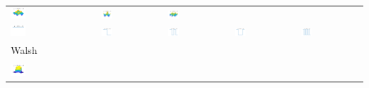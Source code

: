 \documentclass[11pt,compress,xcolor={usenames,dvipsnames},aspectratio=169]{beamer}
\begin{document}
\begin{frame}
\begin{tabular}{>{\centering}m{}>{\centering}m{}>{\centering}m{}>{\centering}m{}>{\centering}m{}}
\includegraphics[width =0.18\textwidth]{ProgramsImages/CosineSine_Degree_1_3.png}  &
\includegraphics[width =0.18\textwidth]{ProgramsImages/CosineSine_Degree_2_2.png}  &
\includegraphics[width =0.18\textwidth]{ProgramsImages/CosineSine_Degree_2_3.png} 
\tabularnewline[0ex]
		\includegraphics[width =0.18\textwidth]{ProgramsImages/Walsh_Degree_0.png}  &
\includegraphics[width =0.18\textwidth]{ProgramsImages/Walsh_Degree_1.png}  &
\includegraphics[width =0.18\textwidth]{ProgramsImages/Walsh_Degree_2.png}  &
\includegraphics[width =0.18\textwidth]{ProgramsImages/Walsh_Degree_3.png}  &
\includegraphics[width =0.18\textwidth]{ProgramsImages/Walsh_Degree_4.png} 
\tabularnewline[-7ex]
Walsh \tabularnewline
\tabularnewline
\includegraphics[width =0.18\textwidth]{ProgramsImages/Walsh_Degree_1_1.png}  &

\end{tabular}
\end{frame}
\end{document}
